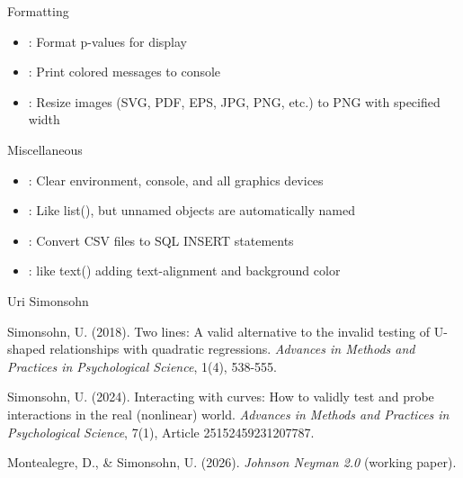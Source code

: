 \documentclass[a4paper]{book}
\begin{document}
%
\begin{Section}{Formatting}

\begin{itemize}

\item{} : Format p-values for display
\item{} : Print colored messages to console
\item{} : Resize images (SVG, PDF, EPS, JPG, PNG, etc.) to PNG with specified width

\end{itemize}

\end{Section}
%
\begin{Section}{Miscellaneous}

\begin{itemize}

\item{} : Clear environment, console, and all graphics devices
\item{} : Like list(), but unnamed objects are automatically named
\item{} : Convert CSV files to SQL INSERT statements
\item{} : like text() adding text-alignment and background color

\end{itemize}

\end{Section}
%
\begin{Author}
Uri Simonsohn 
\end{Author}
%
\begin{References}
Simonsohn, U. (2018). Two lines: A valid alternative to the invalid testing of 
U-shaped relationships with quadratic regressions. \emph{Advances in Methods and 
Practices in Psychological Science}, 1(4), 538-555. 

Simonsohn, U. (2024). Interacting with curves: How to validly test and probe interactions in the real (nonlinear) world. \emph{Advances in Methods and Practices in Psychological Science}, 7(1), Article 25152459231207787. 

Montealegre, D., \& Simonsohn, U. (2026). \emph{Johnson Neyman 2.0} (working paper).
\end{References}
\end{document}
